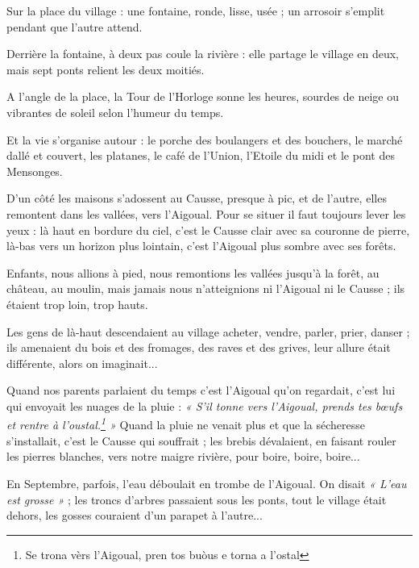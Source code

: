 


\vspace{3.0em}

Sur la place du village : une fontaine, ronde, lisse, usée ; un arrosoir s’emplit pendant que
l’autre attend.

Derrière la fontaine, à deux pas coule la rivière : elle partage le village en deux, mais sept
ponts relient les deux moitiés.

A l’angle de la place, la Tour de l’Horloge sonne les heures, sourdes de neige ou vibrantes de
soleil selon l’humeur du temps.

Et la vie s’organise autour : le porche des boulangers et des bouchers, le marché dallé et
couvert, les platanes, le café de l’Union, l’Etoile du midi et le pont des Mensonges.

D’un côté les maisons s’adossent au Causse, presque à pic, et de l’autre, elles remontent dans
les vallées, vers l’Aigoual. Pour se situer il faut toujours lever les yeux : là haut en bordure du
ciel, c’est le Causse clair avec sa couronne de pierre, là-bas vers un horizon plus lointain, c’est
l’Aigoual plus sombre avec ses forêts.

Enfants, nous allions à pied, nous remontions les vallées jusqu’à la forêt, au château, au
moulin, mais jamais nous n’atteignions ni l’Aigoual ni le Causse ; ils étaient trop loin, trop
hauts.

Les gens de là-haut descendaient au village acheter, vendre, parler, prier, danser ; ils
amenaient du bois et des fromages, des raves et des grives, leur allure était différente, alors on
imaginait...

Quand nos parents parlaient du temps c’est l’Aigoual qu’on regardait, c’est lui qui envoyait
les nuages de la pluie : \textit{« S’il tonne vers l’Aigoual, prends tes bœufs et rentre à l’oustal.\footnote{Se trona vèrs l'Aigoual, pren tos buòus e torna a l'ostal} »}
Quand la pluie ne venait plus et que la sécheresse s’installait, c’est le Causse qui souffrait ; les
brebis dévalaient, en faisant rouler les pierres blanches, vers notre maigre rivière, pour boire,
boire, boire...

En Septembre, parfois, l’eau déboulait en trombe de l’Aigoual. On disait \textit{« L’eau est
grosse »} ; les troncs d’arbres passaient sous les ponts, tout le village était dehors, les gosses
couraient d’un parapet à l’autre...

